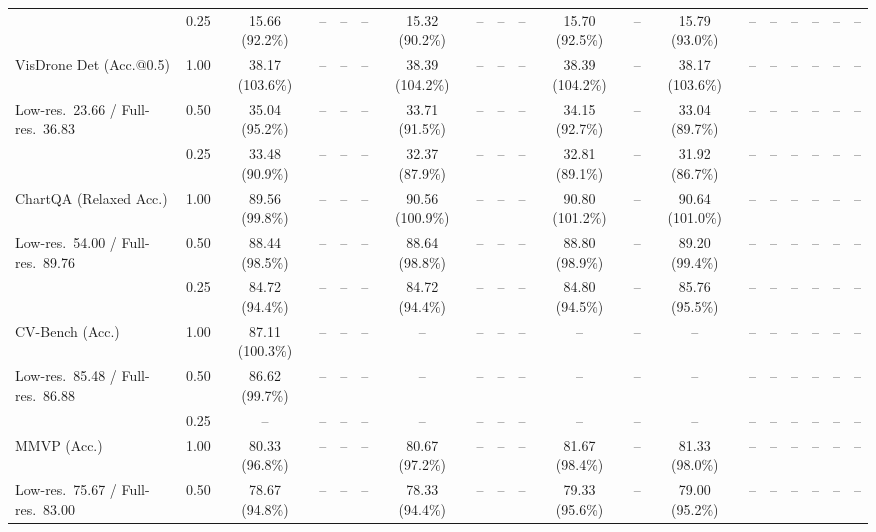 \begin{table}[t]
{\begin{tabular}{l c | c c c c | c c c c | c c | c c c | c c c c}
 & 0.25 & 15.66 (92.2\%) & -- & -- & -- & 15.32 (90.2\%) & -- & -- & -- & 15.70 (92.5\%) & -- & 15.79 (93.0\%) & -- & -- & -- & -- & -- & -- \\
\cmidrule(lr){1-19}
VisDrone Det (Acc.@0.5) & 1.00 & \cellcolor{gray!15}38.17 (103.6\%) & -- & -- & -- & \cellcolor{gray!15}38.39 (104.2\%) & -- & -- & -- & \cellcolor{gray!15}38.39 (104.2\%) & -- & \cellcolor{gray!15}38.17 (103.6\%) & -- & -- & -- & -- & -- & -- \\
{\footnotesize Low-res.\ 23.66 / Full-res.\ 36.83} & 0.50 & 35.04 (95.2\%) & -- & -- & -- & 33.71 (91.5\%) & -- & -- & -- & 34.15 (92.7\%) & -- & 33.04 (89.7\%) & -- & -- & -- & -- & -- & -- \\
 & 0.25 & 33.48 (90.9\%) & -- & -- & -- & 32.37 (87.9\%) & -- & -- & -- & 32.81 (89.1\%) & -- & 31.92 (86.7\%) & -- & -- & -- & -- & -- & -- \\
\cmidrule(lr){1-19}
ChartQA (Relaxed Acc.) & 1.00 & \cellcolor{gray!15}89.56 (99.8\%) & -- & -- & -- & \cellcolor{gray!15}90.56 (100.9\%) & -- & -- & -- & \cellcolor{gray!15}90.80 (101.2\%) & -- & \cellcolor{gray!15}90.64 (101.0\%) & -- & -- & -- & -- & -- & -- \\
{\footnotesize Low-res.\ 54.00 / Full-res.\ 89.76} & 0.50 & \cellcolor{gray!15}88.44 (98.5\%) & -- & -- & -- & \cellcolor{gray!15}88.64 (98.8\%) & -- & -- & -- & \cellcolor{gray!15}88.80 (98.9\%) & -- & \cellcolor{gray!15}89.20 (99.4\%) & -- & -- & -- & -- & -- & -- \\
 & 0.25 & 84.72 (94.4\%) & -- & -- & -- & 84.72 (94.4\%) & -- & -- & -- & 84.80 (94.5\%) & -- & 85.76 (95.5\%) & -- & -- & -- & -- & -- & -- \\
\cmidrule(lr){1-19}
CV-Bench (Acc.) & 1.00 & \cellcolor{gray!15}87.11 (100.3\%) & -- & -- & -- & -- & -- & -- & -- & -- & -- & -- & -- & -- & -- & -- & -- & -- \\
{\footnotesize Low-res.\ 85.48 / Full-res.\ 86.88} & 0.50 & \cellcolor{gray!15}86.62 (99.7\%) & -- & -- & -- & -- & -- & -- & -- & -- & -- & -- & -- & -- & -- & -- & -- & -- \\
 & 0.25 & -- & -- & -- & -- & -- & -- & -- & -- & -- & -- & -- & -- & -- & -- & -- & -- & -- \\
\cmidrule(lr){1-19}
MMVP (Acc.) & 1.00 & 80.33 (96.8\%) & -- & -- & -- & 80.67 (97.2\%) & -- & -- & -- & \cellcolor{gray!15}81.67 (98.4\%) & -- & 81.33 (98.0\%) & -- & -- & -- & -- & -- & -- \\
{\footnotesize Low-res.\ 75.67 / Full-res.\ 83.00} & 0.50 & 78.67 (94.8\%) & -- & -- & -- & 78.33 (94.4\%) & -- & -- & -- & 79.33 (95.6\%) & -- & 79.00 (95.2\%) & -- & -- & -- & -- & -- & -- \\

\end{tabular}}
\end{table}
